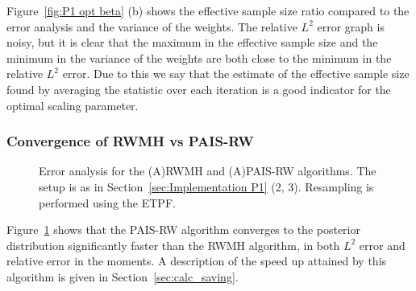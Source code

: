 \documentclass[final]{siamltex}
\begin{document}
Figure~\ref{fig:P1 opt beta} (b) shows the effective sample size ratio
compared to the error analysis and the variance of the weights. The
relative $L^2$ error graph is noisy, but it is clear that the maximum
in the effective sample size and the minimum in the variance of the
weights are both close to the minimum in the relative $L^2$ error. Due
to this we say that the estimate of the effective sample size found by
averaging the statistic over each iteration is a good indicator for
the optimal scaling parameter.


\subsubsection{Convergence of RWMH vs PAIS-RW}

\begin{figure}[htb]
\centering
{}
\caption{Error analysis for the (A)RWMH and (A)PAIS-RW algorithms. The setup is as in Section~\ref{sec:Implementation P1} (2, 3). Resampling is performed using the ETPF.}
\label{fig:MH1 L2}
\end{figure}

Figure~\ref{fig:MH1 L2} shows that the PAIS-RW algorithm converges to
the posterior distribution significantly faster than the RWMH
algorithm, in both $L^2$ error and relative error in the moments. A
description of the speed up attained by this algorithm is given in
Section~\ref{sec:calc_saving}.
\end{document}
